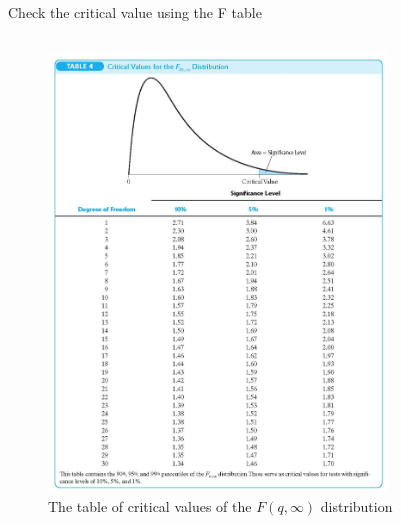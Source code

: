 \documentclass[presentation,10pt]{beamer}
\begin{document}
\begin{frame}[label={sec:org4c71e80}]{Check the critical value using the F table}
\begin{columns}
\begin{column}{0.5\columnwidth}
\begin{figure}[htbp]
\centering
\includegraphics[width=0.8\textwidth]{img/fdist.png}
\caption{The table of critical values of the \(F(q, \infty)\) distribution}
\end{figure}
\end{column}


\end{columns}
\end{frame}
\end{document}
